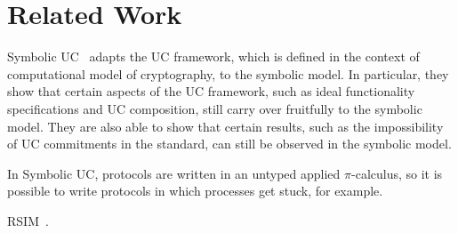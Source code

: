 \section{Related Work}
\label{sec:related}

Symbolic UC~\cite{bohl2016symbolic} adapts the UC framework, which is defined in
the context of computational model of cryptography, to the symbolic model. In
particular, they show that certain aspects of the UC framework, such as ideal
functionality specifications and UC composition, still carry over fruitfully to
the symbolic model. They are also able to show that certain results, such as the
impossibility of UC commitments in the standard, can still be observed in the
symbolic model.

In Symbolic UC, protocols are written in an untyped applied $\pi$-calculus, so it
is possible to write protocols in which processes get stuck, for
example. 

RSIM~\cite{backes2007reactive}.
